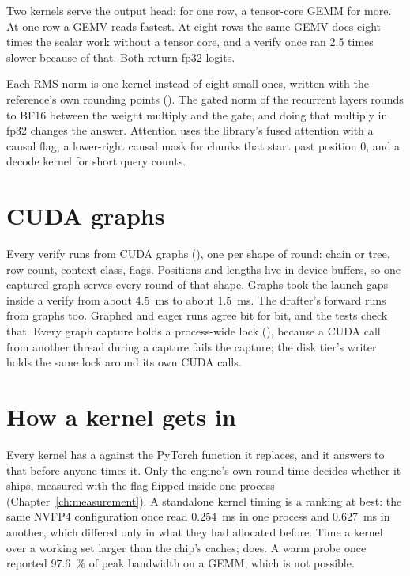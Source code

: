Two kernels serve the output head:  for one row, a tensor-core GEMM for more. At one row a GEMV reads fastest. At eight rows the same GEMV does eight times the scalar work without a tensor core, and a verify once ran 2.5 times slower because of that. Both return fp32 logits.

Each RMS norm is one kernel instead of eight small ones, written with the reference's own rounding points (). The gated norm of the recurrent layers rounds to BF16 between the weight multiply and the gate, and doing that multiply in fp32 changes the answer. Attention uses the library's fused attention with a causal flag, a lower-right causal mask for chunks that start past position 0, and a decode kernel for short query counts.

\section{CUDA graphs}

Every verify runs from CUDA graphs (), one per shape of round: chain or tree, row count, context class, flags. Positions and lengths live in device buffers, so one captured graph serves every round of that shape. Graphs took the launch gaps inside a verify from about 4.5~ms to about 1.5~ms. The drafter's forward runs from graphs too. Graphed and eager runs agree bit for bit, and the tests check that. Every graph capture holds a process-wide lock (), because a CUDA call from another thread during a capture fails the capture; the disk tier's writer holds the same lock around its own CUDA calls.

\section{How a kernel gets in}

Every kernel has a  against the PyTorch function it replaces, and it answers to that before anyone times it. Only the engine's own round time decides whether it ships, measured with the flag flipped inside one process (Chapter~\ref{ch:measurement}). A standalone kernel timing is a ranking at best: the same NVFP4 configuration once read 0.254~ms in one process and 0.627~ms in another, which differed only in what they had allocated before. Time a kernel over a working set larger than the chip's caches;  does. A warm probe once reported 97.6~\% of peak bandwidth on a GEMM, which is not possible.

